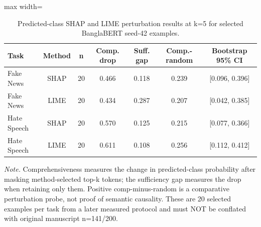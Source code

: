 \begin{table}[t]
\centering
\caption{Predicted-class SHAP and LIME perturbation results at k=5 for selected BanglaBERT seed-42 examples.}
\label{tab:xai}
\footnotesize
\begin{adjustbox}{max width=\linewidth}
\begin{tabular}{lcccccc}
\toprule
Task & Method & n & Comp. drop & Suff. gap & Comp.-random & Bootstrap 95\% CI \\
\midrule
Fake News & SHAP & 20 & 0.466 & 0.118 & 0.239 & [0.096, 0.396] \\
Fake News & LIME & 20 & 0.434 & 0.287 & 0.207 & [0.042, 0.385] \\
Hate Speech & SHAP & 20 & 0.570 & 0.125 & 0.215 & [0.077, 0.366] \\
Hate Speech & LIME & 20 & 0.611 & 0.108 & 0.256 & [0.112, 0.412] \\
\bottomrule
\end{tabular}
\end{adjustbox}
\par\vspace{2pt}
\begin{minipage}{\linewidth}
\scriptsize\emph{Note.} Comprehensiveness measures the change in predicted-class probability after masking method-selected top-k tokens; the sufficiency gap measures the drop when retaining only them. Positive comp-minus-random is a comparative perturbation probe, not proof of semantic causality. These are 20 selected examples per task from a later measured protocol and must NOT be conflated with original manuscript n=141/200.
\end{minipage}
\end{table}

